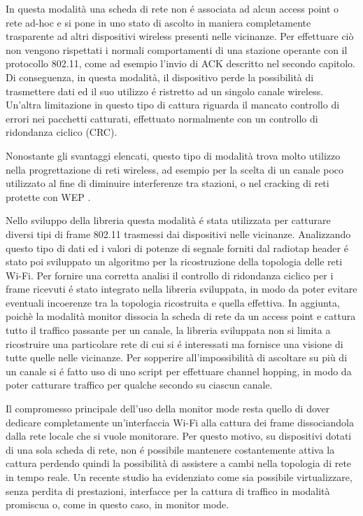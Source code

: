 In questa modalit\`a una scheda di rete non \'e associata ad alcun access point o rete ad-hoc e si pone in uno stato di ascolto in maniera completamente trasparente ad altri dispositivi wireless presenti nelle vicinanze.
Per effettuare ci\`o non vengono rispettati i normali comportamenti di una stazione operante con il protocollo 802.11, come ad esempio l'invio di ACK descritto nel secondo capitolo.
Di conseguenza, in questa modalit\`a, il dispositivo perde la possibilit\`a di trasmettere dati ed il suo utilizzo \'e ristretto ad un singolo canale wireless.
Un'altra limitazione in questo tipo di cattura riguarda il mancato controllo di errori nei pacchetti catturati, effettuato normalmente con un controllo di ridondanza ciclico (CRC).

Nonostante gli svantaggi elencati, questo tipo di modalit\`a trova molto utilizzo nella progrettazione di reti wireless, ad esempio per la scelta di un canale poco utilizzato al fine di diminuire interferenze tra stazioni, o nel cracking di reti protette con WEP .

Nello sviluppo della libreria questa modalit\`a \'e stata utilizzata per catturare diversi tipi di frame 802.11 trasmessi dai dispositivi nelle vicinanze.
Analizzando questo tipo di dati ed i valori di potenze di segnale forniti dal radiotap header \'e stato poi sviluppato un algoritmo per la ricostruzione della topologia delle reti Wi-Fi.
Per fornire una corretta analisi il controllo di ridondanza ciclico per i frame ricevuti  \'e stato integrato nella libreria sviluppata, in modo da poter evitare eventuali incoerenze tra la topologia ricostruita e quella effettiva.
In aggiunta, poich\`e la modalit\`a monitor dissocia la scheda di rete da un access point e cattura tutto il traffico passante per un canale, la libreria sviluppata non si limita a ricostruire una particolare rete di cui si \'e interessati ma fornisce una visione di tutte quelle nelle vicinanze.
Per sopperire all'impossibilit\`a di ascoltare su pi\`u di un canale si \'e fatto uso di uno script per effettuare channel hopping, in modo da poter catturare traffico per qualche secondo su ciascun canale.

Il compromesso principale dell'uso della monitor mode resta quello di dover dedicare completamente un'interfaccia Wi-Fi alla cattura dei frame dissociandola dalla rete locale che si vuole monitorare.
Per questo motivo, su dispositivi dotati di una sola scheda di rete, non \'e possibile mantenere costantemente attiva la cattura perdendo quindi la possibilit\`a di assistere a cambi nella topologia di rete in tempo reale. 
Un recente studio \cite{zanetti2010non} ha evidenziato come sia possibile virtualizzare, senza perdita di prestazioni, interfacce per la cattura di traffico in modalit\`a promiscua o, come in questo caso, in monitor mode.

